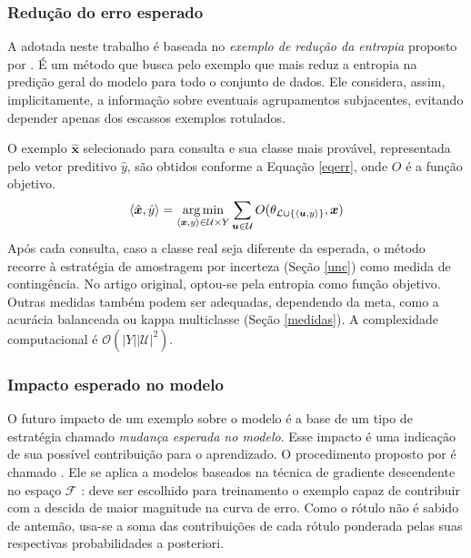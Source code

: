 \subsubsection{Redução do erro esperado}
A  adotada neste trabalho é baseada no \textit{exemplo de redução da entropia} proposto por \cite{conf/ijcai/GuoG07}.
É um método que busca pelo exemplo que mais reduz a entropia na predição geral do modelo para todo o conjunto de dados.
Ele considera, assim, implicitamente, a informação sobre eventuais agrupamentos subjacentes, evitando depender apenas dos escassos exemplos rotulados.

O exemplo $\hat{\bm{x}}$ selecionado para consulta e sua classe mais provável, representada pelo vetor preditivo $\hat{y}$, são obtidos conforme a Equação \ref{eqerr}, onde $O$ é a função objetivo.
\begin{equation}\label{eqerr}
 \langle \hat{\bm{x}}, \hat{y} \rangle = \operatorname*{arg\,min}_{\langle \bm{x}, y \rangle \in \mathcal{U} \times Y}{\sum_{\bm{u} \in \mathcal{U}} O(\theta_{\mathcal{L}\cup
\{\langle\bm{u},y\rangle\}}, \bm{x})}
\end{equation}
Após cada consulta, caso a classe real seja diferente da esperada, o método recorre à estratégia de amostragem por incerteza (Seção \ref{unc}) como medida de contingência.
No artigo original, optou-se pela entropia como função objetivo.
Outras medidas também podem ser adequadas, dependendo da meta, como a acurácia balanceada ou kappa multiclasse (Seção \ref{medidas}).
A complexidade computacional é $\mathcal{O}(|Y||\mathcal{U}|^2)$.

\subsubsection{Impacto esperado no modelo}
O futuro impacto de um exemplo sobre o modelo é a base de um tipo de estratégia chamado \textit{mudança esperada no modelo}.
Esse impacto é uma indicação de sua possível contribuição para o aprendizado.
O procedimento proposto por \cite{conf/nips/SettlesCR07} é chamado .
Ele se aplica a modelos baseados na técnica de gradiente descendente
no espaço $\mathcal{F}$ \cite{haykin2004comprehensive}:
deve ser escolhido para treinamento o exemplo capaz de contribuir com a descida de maior magnitude na curva de erro.
Como o rótulo não é sabido de antemão, usa-se a soma das contribuições de cada rótulo ponderada pelas suas respectivas probabilidades a posteriori.


